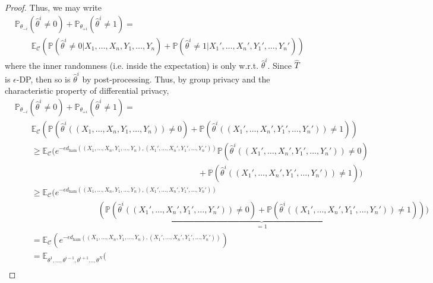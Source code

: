 \documentclass{article}
\theoremstyle{plain}
\theoremstyle{definition}
\theoremstyle{remark}
\newcommand{\Prob}[0]{\mathbb{P}}
\newcommand{\E}[0]{\mathbb{E}}
\newcommand\ham[2]{d_\mathrm{ham}\left( {#1}, {#2} \right)}
\newcommand\p[1]{\left( {#1}\right)}
\begin{document}
\begin{proof}
    Thus, we may write
    \begin{equation}
        \begin{aligned}
            &\Prob_{{{\theta_{-i}}}} (\hat{\theta}^i \neq 0) + \Prob_{{{\theta_{+i}}}} (\hat{\theta}^i \neq 1) = \\
            &\quad\quad
            \E_{\mathcal{C}} \p{\Prob (\hat{\theta}^i \neq 0 | X_1, \dots, X_n, Y_1, \dots, Y_n) + \Prob (\hat{\theta}^i \neq 1 | X_1', \dots, X_n', Y_1', \dots, Y_n')}
        \end{aligned}
    \end{equation}
    where the inner randomness (i.e. inside the expectation) is only w.r.t. $\hat{\theta}^i$. Since $\hat{T}$ is $\epsilon$-DP, then so is $\hat{\theta}^i$ by post-processing. Thus, by group privacy and the characteristic property of differential privacy,
    \begin{equation}
        \begin{aligned}
            &\Prob_{{{\theta_{-i}}}} (\hat{\theta}^i \neq 0) + \Prob_{{{\theta_{+i}}}} (\hat{\theta}^i \neq 1) = \\
            &\quad\quad \E_{\mathcal{C}} \p{\Prob (\hat{\theta}^i((X_1, \dots, X_n, Y_1, \dots, Y_n)) \neq 0) + \Prob (\hat{\theta}^i((X_1', \dots, X_n', Y_1', \dots, Y_n')) \neq 1)} \\
            &\quad\quad \geq \E_{\mathcal{C}} \Bigg(e^{- \epsilon \ham{(X_1, \dots, X_n, Y_1, \dots, Y_n)}{(X_1', \dots, X_n', Y_1', \dots, Y_n')}}\Prob (\hat{\theta}^i((X_1', \dots, X_n', Y_1', \dots, Y_n')) \neq 0) \\
            &\qquad\qquad\qquad\qquad\qquad\qquad\qquad\qquad\qquad\qquad\qquad+ \Prob (\hat{\theta}^i((X_1', \dots, X_n', Y_1', \dots, Y_n')) \neq 1)\Bigg) \\
            &\quad\quad \geq \E_{\mathcal{C}} \Bigg(e^{- \epsilon \ham{(X_1, \dots, X_n, Y_1, \dots, Y_n)}{(X_1', \dots, X_n', Y_1', \dots, Y_n')}} \\
            &\qquad\qquad\qquad\qquad\qquad 
            \underbrace{\p{\Prob (\hat{\theta}^i((X_1', \dots, X_n', Y_1', \dots, Y_n')) \neq 0)+ \Prob (\hat{\theta}^i((X_1', \dots, X_n', Y_1', \dots, Y_n')) \neq 1)}}_{=1}\Bigg) \\
            &\quad\quad = \E_{\mathcal{C}} \p{e^{- \epsilon \ham{(X_1, \dots, X_n, Y_1, \dots, Y_n)}{(X_1', \dots, X_n', Y_1', \dots, Y_n')}}} \\
            &\quad\quad = \E_{\theta^1, \dots, \theta^{i-1}, \theta^{i+1} \dots, \theta^{N}} \Bigg(  \\

\end{aligned}
\end{equation}
\end{proof}
\end{document}
